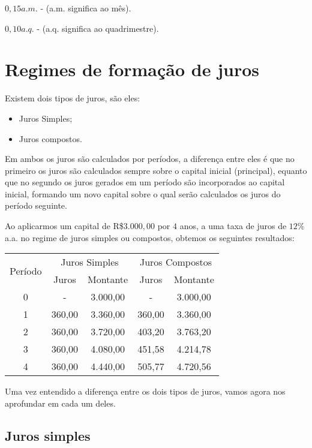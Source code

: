  $0,15 a.m.$ - (a.m. significa ao mês).

 $0,10 a.q.$ - (a.q. significa ao quadrimestre).

 \newpage

 \section{Regimes de formação de juros}

 Existem dois tipos de juros, são eles:
 \begin{itemize}
  \item Juros Simples;
  \item Juros compostos.
 \end{itemize}
 Em ambos os juros são calculados por períodos, a diferença entre eles é que no primeiro os juros são calculados sempre sobre o capital inicial (principal), equanto que no segundo os juros gerados em um período são incorporados ao capital inicial, formando um novo capital sobre o qual serão calculados os juros do período seguinte.

 \begin{exem}
  Ao aplicarmos um capital de R\$$3.000,00$ por $4$ anos, a uma taxa de juros de $12\%$ a.a. no regime de juros simples ou compostos, obtemos os seguintes resultados:
\begin{table}[h]
\centering
\label{my-label}
\begin{tabular}{|c|c|c|c|c|} \hline
\multirow{2}{*}{Período} & \multicolumn{2}{|c|}{Juros Simples} & \multicolumn{2}{|c|}{Juros Compostos} \\
    & Juros  & Montante & Juros  & Montante \\\hline
  0 & -      & 3.000,00 & -      & 3.000,00 \\\hline
  1 & 360,00 & 3.360,00 & 360,00 & 3.360,00 \\\hline
  2 & 360,00 & 3.720,00 & 403,20 & 3.763,20 \\\hline
  3 & 360,00 & 4.080,00 & 451,58 & 4.214,78 \\\hline
  4 & 360,00 & 4.440,00 & 505,77 & 4.720,56 \\\hline
\end{tabular}
\end{table}
 \end{exem}

 Uma vez entendido a diferença entre os dois tipos de juros, vamos agora nos aprofundar em cada um deles.

 \subsection{Juros simples}

